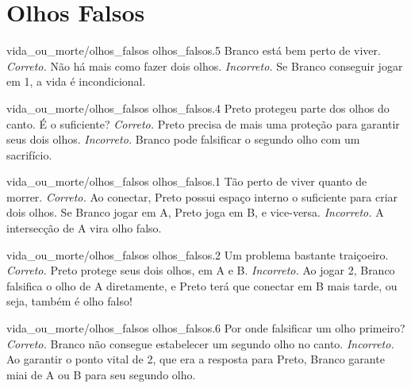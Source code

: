 \chapter{Olhos Falsos}

\emptypage

\problemAnswerDiagram
  {vida_ou_morte/olhos_falsos}
  {olhos_falsos.5}
  {Branco está bem perto de viver.}
  {\emph{Correto.} Não há mais como fazer dois olhos.}
  {\emph{Incorreto.} Se Branco conseguir jogar em 1, a vida é incondicional.}

\problemAnswerDiagram
  {vida_ou_morte/olhos_falsos}
  {olhos_falsos.4}
  {Preto protegeu parte dos olhos do canto. É o suficiente?}
  {\emph{Correto.} Preto precisa de mais uma proteção para garantir seus dois olhos.}
  {\emph{Incorreto.} Branco pode falsificar o segundo olho com um sacrifício.}

\problemAnswerDiagram
  {vida_ou_morte/olhos_falsos}
  {olhos_falsos.1}
  {Tão perto de viver quanto de morrer.}
  {\emph{Correto.} Ao conectar, Preto possui espaço interno o suficiente para criar dois olhos. Se Branco jogar em A, Preto joga em B, e vice-versa.}
  {\emph{Incorreto.} A intersecção de A vira olho falso.}

\problemAnswerDiagram
  {vida_ou_morte/olhos_falsos}
  {olhos_falsos.2}
  {Um problema bastante traiçoeiro.}
  {\emph{Correto.} Preto protege seus dois olhos, em A e B.}
  {\emph{Incorreto.} Ao jogar 2, Branco falsifica o olho de A diretamente, e Preto terá que conectar em B mais tarde, ou seja, também é olho falso!}

\problemAnswerDiagram
  {vida_ou_morte/olhos_falsos}
  {olhos_falsos.6}
  {Por onde falsificar um olho primeiro?}
  {\emph{Correto.} Branco não consegue estabelecer um segundo olho no canto.}
  {\emph{Incorreto.} Ao garantir o ponto vital de 2, que era a resposta para Preto, Branco garante miai de A ou B para seu segundo olho.}
